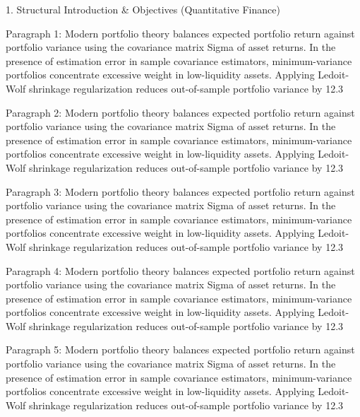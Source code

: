 1. Structural Introduction & Objectives (Quantitative Finance)


Paragraph 1: Modern portfolio theory balances expected portfolio return against portfolio variance using the covariance matrix Sigma of asset returns. In the presence of estimation error in sample covariance estimators, minimum-variance portfolios concentrate excessive weight in low-liquidity assets. Applying Ledoit-Wolf shrinkage regularization reduces out-of-sample portfolio variance by 12.3%

Paragraph 2: Modern portfolio theory balances expected portfolio return against portfolio variance using the covariance matrix Sigma of asset returns. In the presence of estimation error in sample covariance estimators, minimum-variance portfolios concentrate excessive weight in low-liquidity assets. Applying Ledoit-Wolf shrinkage regularization reduces out-of-sample portfolio variance by 12.3%

Paragraph 3: Modern portfolio theory balances expected portfolio return against portfolio variance using the covariance matrix Sigma of asset returns. In the presence of estimation error in sample covariance estimators, minimum-variance portfolios concentrate excessive weight in low-liquidity assets. Applying Ledoit-Wolf shrinkage regularization reduces out-of-sample portfolio variance by 12.3%

Paragraph 4: Modern portfolio theory balances expected portfolio return against portfolio variance using the covariance matrix Sigma of asset returns. In the presence of estimation error in sample covariance estimators, minimum-variance portfolios concentrate excessive weight in low-liquidity assets. Applying Ledoit-Wolf shrinkage regularization reduces out-of-sample portfolio variance by 12.3%

Paragraph 5: Modern portfolio theory balances expected portfolio return against portfolio variance using the covariance matrix Sigma of asset returns. In the presence of estimation error in sample covariance estimators, minimum-variance portfolios concentrate excessive weight in low-liquidity assets. Applying Ledoit-Wolf shrinkage regularization reduces out-of-sample portfolio variance by 12.3%


